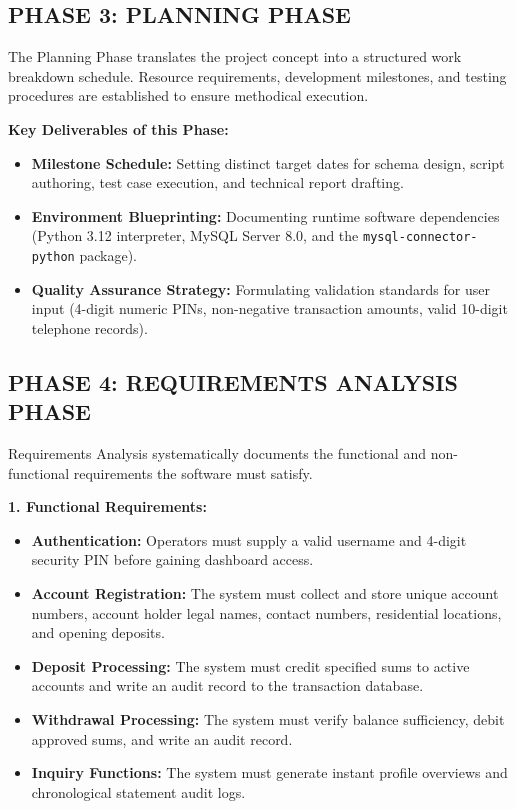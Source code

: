 \documentclass[12pt,a4paper]{article}
\begin{document}
\clearpage

\subsection*{PHASE 3: PLANNING PHASE}
The Planning Phase translates the project concept into a structured work breakdown schedule. Resource requirements, development milestones, and testing procedures are established to ensure methodical execution.

\vspace{0.4em}
\noindent\textbf{Key Deliverables of this Phase:}
\begin{itemize}
    \item \textbf{Milestone Schedule:} Setting distinct target dates for schema design, script authoring, test case execution, and technical report drafting.
    \item \textbf{Environment Blueprinting:} Documenting runtime software dependencies (Python 3.12 interpreter, MySQL Server 8.0, and the \texttt{mysql-connector-python} package).
    \item \textbf{Quality Assurance Strategy:} Formulating validation standards for user input (4-digit numeric PINs, non-negative transaction amounts, valid 10-digit telephone records).
\end{itemize}

\vspace{1.2em}
\subsection*{PHASE 4: REQUIREMENTS ANALYSIS PHASE}
Requirements Analysis systematically documents the functional and non-functional requirements the software must satisfy.

\vspace{0.4em}
\noindent\textbf{1. Functional Requirements:}
\begin{itemize}
    \item \textbf{Authentication:} Operators must supply a valid username and 4-digit security PIN before gaining dashboard access.
    \item \textbf{Account Registration:} The system must collect and store unique account numbers, account holder legal names, contact numbers, residential locations, and opening deposits.
    \item \textbf{Deposit Processing:} The system must credit specified sums to active accounts and write an audit record to the transaction database.
    \item \textbf{Withdrawal Processing:} The system must verify balance sufficiency, debit approved sums, and write an audit record.
    \item \textbf{Inquiry Functions:} The system must generate instant profile overviews and chronological statement audit logs.
\end{itemize}
\end{document}
